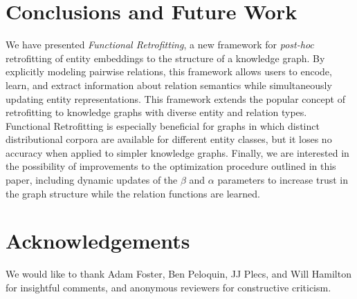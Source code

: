 \documentclass[11pt, a4paper]{article}
\begin{document}
\section{Conclusions and Future Work}
We have presented \textit{Functional Retrofitting}, a new framework for \textit{post-hoc} retrofitting of entity embeddings to the structure of a knowledge graph. By explicitly modeling pairwise relations, this framework allows users to encode, learn, and extract information about relation semantics while simultaneously updating entity representations. This framework extends the popular concept of retrofitting to knowledge graphs with diverse entity and relation types. Functional Retrofitting is especially beneficial for graphs in which distinct distributional corpora are available for different entity classes, but it loses no accuracy when applied to simpler knowledge graphs. Finally, we are interested in the possibility of improvements to the optimization procedure outlined in this paper, including dynamic updates of the $\beta$ and $\alpha$ parameters to increase trust in the graph structure while the relation functions are learned.






\section*{Acknowledgements}
We would like to thank Adam Foster, Ben Peloquin, JJ Plecs, and Will Hamilton for insightful comments, and anonymous reviewers for constructive criticism.




\appendix{}
\end{document}
